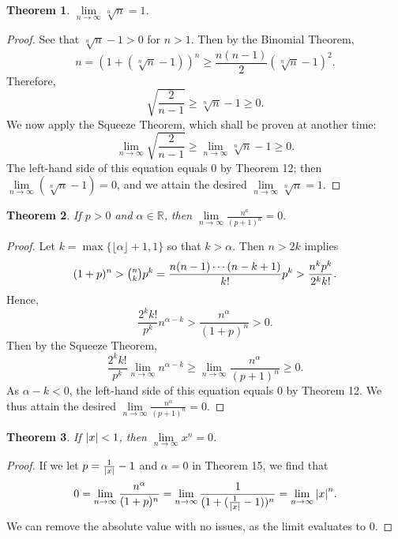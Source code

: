\documentclass[11pt]{article}
\newtheorem{theorem}{Theorem}
\begin{document}
\begin{theorem}
	$\lim\limits_{n \to \infty} \sqrt[n]{n} = 1$.
\end{theorem}
\begin{adjustwidth}{0.5cm}{}
	\begin{proof}
		See that $\sqrt[n]{n} - 1 > 0$ for $n > 1$. Then by the Binomial Theorem,
		\[
			n = (1 + (\sqrt[n]{n} - 1))^{n} \ge \frac{n(n - 1)}{2} (\sqrt[n]{n} - 1)^{2}.
		\]
		Therefore,
		\[
			\sqrt{\frac{2}{n - 1}} \ge \sqrt[n]{n} - 1 \ge 0.
		\]
		We now apply the Squeeze Theorem, which shall be proven at another time:
		\[
			\lim\limits_{n \to \infty} \sqrt{\frac{2}{n - 1}} \ge \lim\limits_{n \to \infty} \sqrt[n]{n} - 1 \ge 0.
		\]
		The left-hand side of this equation equals $0$ by Theorem 12; then $\lim\limits_{n \to \infty} (\sqrt[n]{n} - 1) = 0$, and we attain the desired $\lim\limits_{n \to \infty} \sqrt[n]{n} = 1$.
	\end{proof}
\end{adjustwidth}

\begin{theorem}
	If $p > 0$ and $\alpha \in \mathbb{R}$, then $\lim\limits_{n \to \infty} \frac{n^{a}}{(p + 1)^{n}} = 0.$
\end{theorem}
\begin{adjustwidth}{0.5cm}{}
	\begin{proof}
		Let $k = \max \{ \lfloor \alpha \rfloor + 1, 1 \}$ so that $k > \alpha$. Then $n > 2k$ implies
		\[
			(1 + p)^{n} > \tbinom{n}{k} p^{k} = \frac{n(n-1) \cdots (n - k + 1)}{k!} p^{k} > \frac{n^{k}p^{k}}{2^{k}k!}.
		\]
		Hence,
		\[
			\frac{2^{k}k!}{p^{k}}n^{\alpha - k} > \frac{n^{\alpha}}{(1 + p)^{n}} > 0.
		\]
		Then by the Squeeze Theorem,
		\[
			\frac{2^{k}k!}{p^{k}} \lim\limits_{n \to \infty} n^{\alpha - k} \ge \lim\limits_{n \to \infty} \frac{n^{\alpha}}{(p + 1)^{n}} \ge 0.
		\]
		As $\alpha - k < 0$, the left-hand side of this equation equals $0$ by Theorem 12. We thus attain the desired $\lim\limits_{n \to \infty} \frac{n^{\alpha}}{(p + 1)^{n}} = 0$.
	\end{proof}
\end{adjustwidth}

\begin{theorem}
	If $\abs{x} < 1$, then $\lim\limits_{n \to \infty} x^{n} = 0$.
\end{theorem}
\begin{adjustwidth}{0.5cm}{}
	\begin{proof}
		If we let $p = \tfrac{1}{\abs{x}} - 1$ and $\alpha = 0$ in Theorem 15, we find that
		\[
			0 = \lim\limits_{n \to \infty} \frac{n^{\alpha}}{(1 + p)^{n}} = \lim\limits_{n \to \infty} \frac{1}{(1 + (\tfrac{1}{\abs{x}} - 1))^{n}} = \lim\limits_{n \to \infty} \abs{x}^{n}.
		\]
		We can remove the absolute value with no issues, as the limit evaluates to $0$.
	\end{proof}
\end{adjustwidth}
\end{document}
